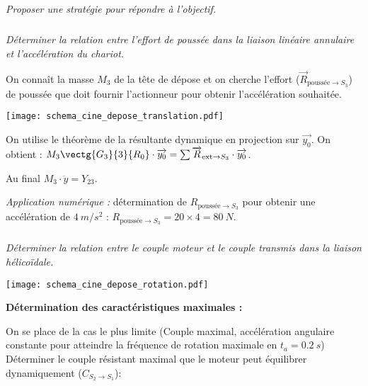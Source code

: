 \begin{multicols}{2}
\subparagraph{}
\textit{Proposer une stratégie pour répondre à l'objectif.}

\subparagraph{}
\textit{Déterminer la relation entre l'effort de poussée dans la liaison linéaire annulaire et l'accélération du chariot.}
\ifprof
\begin{corrige}
On connaît la masse $M_3$ de la tête de dépose et on cherche l'effort ($\overrightarrow{R}_{\text{poussée}\to S_3}$) de poussée que doit fournir l'actionneur pour obtenir l'accélération souhaitée.

\begin{center}
\texttt{[image: schema\_cine\_depose\_translation.pdf]}
\end{center}

On utilise le théorème de la résultante dynamique en projection sur $\overrightarrow{y_0}$. On obtient : $
M_3 \vectg{G_3}{3}{R_0}\cdot \overrightarrow{y_0}=\sum \overrightarrow{R}_{\text{ext}\to S_3}\cdot \overrightarrow{y_0}$.
 
Au final $M_3\cdot \ddot{y}=Y_{23}$.


\textit{Application numérique : } détermination de $R_{\text{pouss\'ee}\to S_3}$ pour obtenir une accélération de $\SI{4}{m/s^2}$ : $R_{\text{pouss\'ee}\to S_3}=20\times 4=\SI{80}{N}
$.
\end{corrige}
\else
\fi


\subparagraph{}
\textit{Déterminer la relation entre le couple moteur et le couple transmis dans la liaison hélicoïdale.}


\ifprof
\begin{corrige}
\begin{center}
\texttt{[image: schema\_cine\_depose\_rotation.pdf]}
\end{center}

\textbf{Détermination des caractéristiques maximales : }


On se place de la cas le plus limite (Couple maximal, accélération angulaire constante pour atteindre la fréquence de rotation maximale en $t_a=\SI{0,2}{s}$)
Déterminer le couple résistant maximal que le moteur peut équilibrer dynamiquement ($C_{S_2\to S_1}$):


\end{corrige}
\end{multicols}
